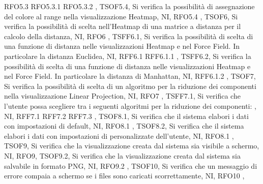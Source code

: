 {{        RFO5.3 RFO5.3.1 RFO5.3.2
    },
    {   
        TSOF5.4,
        Si verifica la possibilità di assegnazione del colore al range nella visualizzazione Heatmap,
        NI,
        RFO5.4
    },
    {   
        TSOF6,
        Si verifica la possibilità di scelta nell'Heatmap di una matrice a distanza per il calcolo della distanza,
        NI,
        RFO6
    },
    {   
        TSFF6.1,
        Si verifica la possibilità di scelta di una funzione di distanza nelle visualizzazioni Heatmap e nel Force Field. In particolare la distanza Euclidea,
        NI,
        RFF6.1 RFF6.1.1
    },
    {   
        TSFF6.2,
        Si verifica la possibilità di scelta di una funzione di distanza nelle visualizzazioni Heatmap e nel Force Field. In particolare la distanza di Manhattan,
        NI,
        RFF6.1.2
    },
    {   
        TSOF7,
        Si verifica la possibilità di scelta di un algoritmo per la riduzione dei componenti nella visualizzazione Linear Projection,
        NI,
        RFO7
    },
    {   
        TSFF7.1,
        Si verifica che l'utente possa scegliere tra i seguenti algoritmi per la riduzione dei componenti:
        ,
        NI,
        RFF7.1 RFF7.2 RFF7.3
    },
    {   
        TSOF8.1,
        Si verifica che il sistema elabori i dati con impostazioni di default,
        NI,
        RFO8.1
    },
    {   
        TSOF8.2,
        Si verifica che il sistema elabori i dati con impostazioni di personalizzate dell'utente,
        NI,
        RFO8.1
    },
    {   
        TSOF9,
        Si verifica che la visualizzazione creata dal sistema sia visibile a schermo,
        NI,
        RFO9},
    {   
        TSOF9.2,
        Si verifica che la visualizzazione creata dal sistema sia salvabile in formato PNG,
        NI,
        RFO9.2
    },
    {   
        TSOF10,
        Si verifica che un messaggio di errore compaia a schermo se i files sono caricati scorrettamente,
        NI,
        RFO10
    },
    }
    
    
